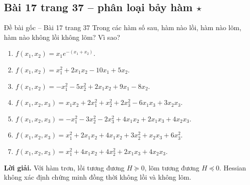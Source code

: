 \documentclass[11pt,a4paper]{article}
\begin{document}
\clearpage
\subsection{Bài 17 trang 37 -- phân loại bảy hàm \(\star\)}
\begin{questionbox}{Đề bài gốc -- Bài 17 trang 37}
Trong các hàm số sau, hàm nào lồi, hàm nào lõm, hàm nào không lồi không lõm? Vì sao?
\begin{enumerate}[label=\roman*),nosep,leftmargin=*]
\item \(f(x_1,x_2)=x_1e^{-(x_1+x_2)}\).
\item \(f(x_1,x_2)=x_1^2+2x_1x_2-10x_1+5x_2\).
\item \(f(x_1,x_2)=-x_1^2-5x_2^2+2x_1x_2+9x_1-8x_2\).
\item \(f(x_1,x_2,x_3)=x_1x_2+2x_1^2+x_2^2+2x_3^2-6x_1x_3+3x_2x_3\).
\item \(f(x_1,x_2,x_3)=-x_1^2-3x_2^2-2x_3^2+4x_1x_2+2x_1x_3+4x_2x_3\).
\item \(f(x_1,x_2,x_3)=x_1^2+2x_1x_2+4x_1x_2+3x_2^2+x_2x_3+6x_3^2\).
\item \(f(x_1,x_2,x_3)=x_1^2+4x_1x_2+4x_2^2+2x_1x_3+4x_2x_3\).
\end{enumerate}
\end{questionbox}
\textbf{Lời giải.} Với hàm trơn, lồi tương đương \(H\succeq0\), lõm tương đương \(H\preceq0\). Hessian không xác định chứng minh đồng thời không lồi và không lõm.
\end{document}
